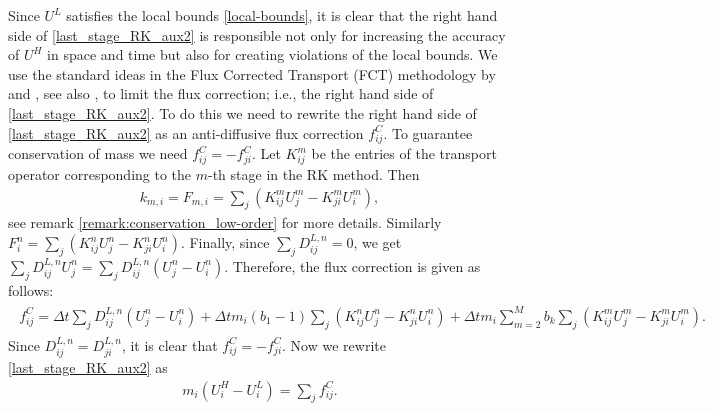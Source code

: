 \documentclass{article}
\numberwithin{remark}{subsection}
\begin{document}
Since $U^L$ satisfies the local bounds \eqref{local-bounds},
it is clear that the right hand side of \eqref{last_stage_RK_aux2}
is responsible not only for increasing the accuracy of $U^H$ in space and time
but also for creating violations of the local bounds.
%
We use the standard ideas in the Flux Corrected Transport (FCT) methodology
by \cite{boris1973flux} and \cite{zalesak1979fully}, see also \cite{kuzmin2012flux},
to limit the flux correction; i.e., the right hand side of \eqref{last_stage_RK_aux2}.
%
To do this we need to rewrite the right hand side of \eqref{last_stage_RK_aux2}
as an anti-diffusive flux correction $f_{ij}^C$.
To guarantee conservation of mass we need $f_{ij}^C=-f_{ji}^C$.
Let $K^m_{ij}$ be the entries of the transport operator corresponding to the $m$-th stage
in the RK method. Then 
\begin{align}
  k_{m,i} = F_{m,i}=\sum_j (K^m_{ij}U_j^m - K^m_{ji}U_i^m),
\end{align}
see remark \ref{remark:conservation_low-order} for more details.
Similarly $F_i^n=\sum_j(K^n_{ij}U_j^n - K^n_{ji}U_i^n)$.
Finally, since $\sum_j D_{ij}^{L,n}=0$, we get
$\sum_jD_{ij}^{L,n}U_j^n=\sum_jD_{ij}^{L,n}(U_j^n-U_i^n)$. Therefore, the flux correction is
given as follows: 
\begin{align}
  \begin{split}
  f_{ij}^C = \Delta t \sum_j D_{ij}^{L,n}(U_j^n-U_i^n)
  +  \Delta t m_i(b_1-1)\sum_j(K^n_{ij}U_j^n - K^n_{ji}U_i^n) 
  +  \Delta t m_i\sum_{m=2}^M b_k \sum_j (K^m_{ij}U_j^m - K^m_{ji}U_i^m).
  \end{split}
\end{align}
Since $D_{ij}^{L,n}=D_{ji}^{L,n}$, it is clear that $f_{ij}^C=-f_{ji}^C$.
Now we rewrite \eqref{last_stage_RK_aux2} as
\begin{align}
  m_i(U_i^H-U_i^L) = \sum_j f_{ij}^C.
\end{align}
\end{document}

